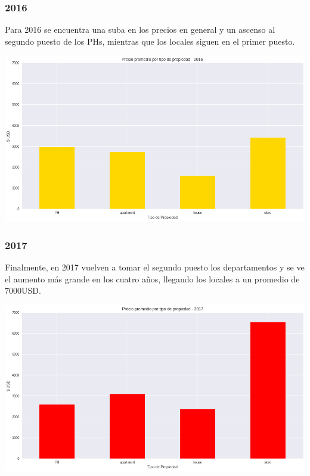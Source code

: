 \documentclass[a4paper, 10pt]{article}
\begin{document}
				\subsubsection{2016}
					Para 2016 se encuentra una suba en los precios en general y un ascenso al segundo puesto de los PHs, mientras
					que los locales siguen en el primer puesto.
					\begin{center}
   		    				\includegraphics[width=\textwidth]{images/propPrice2016}
				  	\end{center}
				\subsubsection{2017}
					Finalmente, en 2017 vuelven a tomar el segundo puesto los departamentos y se ve el aumento más grande en los
					cuatro años, llegando los locales a un promedio de $7000$USD.
					\begin{center}
   		    				\includegraphics[width=\textwidth]{images/propPrice2017}
				  	\end{center}
\end{document}
